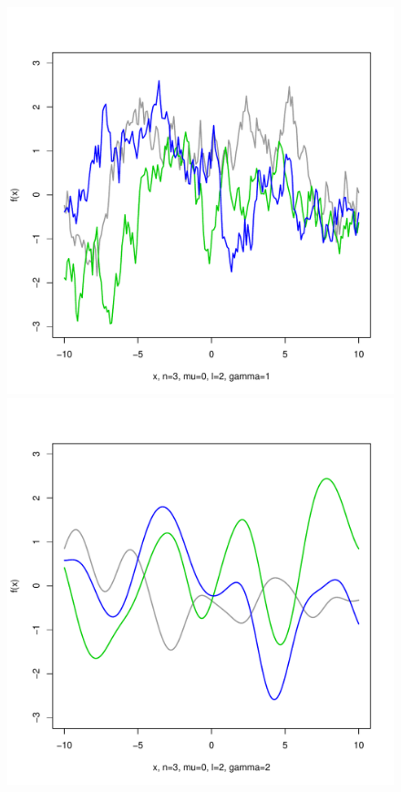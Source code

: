 \documentclass[12pt,letterpaper]{article}
\begin{document}
\begin{figure}
\begin{center}
\includegraphics[scale=0.2]{hw321/n3-m0-l2-g2.pdf}
\includegraphics[scale=0.2]{hw321/n3-m0-l2-g4.pdf}

\end{center}
\end{figure}
\end{document}
